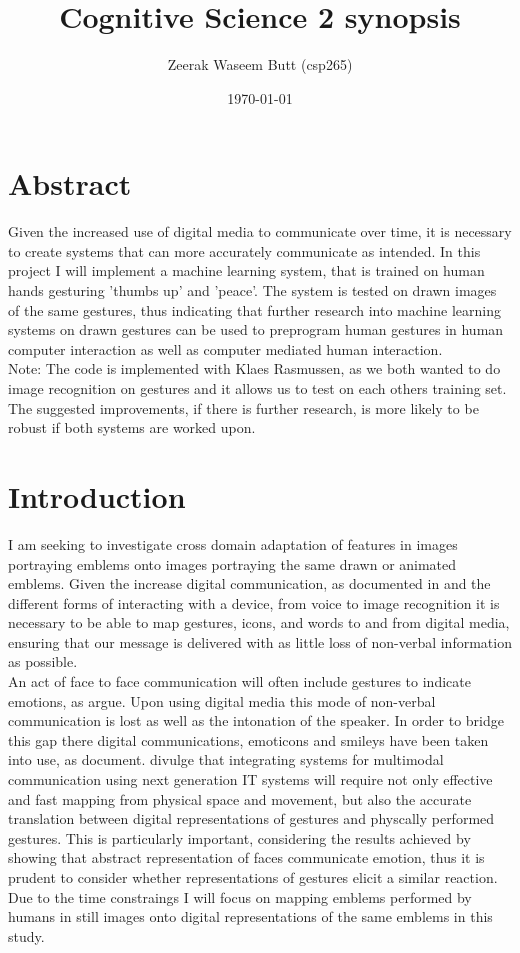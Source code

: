 \documentclass[11pt, a4paper]{article}
\begin{document}
\sloppy
\title{Cognitive Science 2 synopsis}
\author{Zeerak Waseem Butt (csp265)}
\date{\today}
\maketitle
\section{Abstract}
Given the increased use of digital media to communicate over time, it is necessary to create systems that can more accurately communicate as intended. In this project I will implement a machine learning system, that is trained on human hands gesturing 'thumbs up' and 'peace'. The system is tested on drawn images of the same gestures, thus indicating that further research into machine learning systems on drawn gestures can be used to preprogram human gestures in human computer interaction as well as computer mediated human interaction.\\

Note: The code is implemented with Klaes Rasmussen, as we both wanted to do image recognition on gestures and it allows us to test on each others training set. The suggested improvements, if there is further research, is more likely to be robust if both systems are worked upon.\\
\section{Introduction}
I am seeking to investigate cross domain adaptation of features in images portraying emblems onto images portraying the same drawn or animated emblems. Given the increase digital communication, as documented in  and the different forms of interacting with a device, from voice to image recognition it is necessary to be able to map gestures, icons, and words to and from digital media, ensuring that our message is delivered with as little loss of non-verbal information as possible.\\
An act of face to face communication will often include gestures to indicate emotions, as  argue. Upon using digital media this mode of non-verbal communication is lost as well as the intonation of the speaker. In order to bridge this gap there digital communications, emoticons and smileys have been taken into use, as  document.  divulge that integrating systems for multimodal communication using next generation IT systems will require not only effective and fast mapping from physical space and movement, but also the accurate translation between digital representations of gestures and physcally performed gestures. This is particularly important, considering the results achieved by  showing that abstract representation of faces communicate emotion, thus it is prudent to consider whether representations of gestures elicit a similar reaction.\\
Due to the time constraings I will focus on mapping emblems performed by humans in still images onto digital representations of the same emblems in this study.\\
\end{document}
